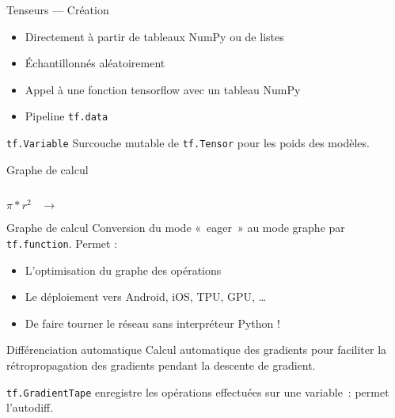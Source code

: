 \begin{frame}{Tenseurs --- Création}
  \begin{itemize}[<+->]
    \item Directement à partir de tableaux NumPy ou de listes
    \item Échantillonnés aléatoirement
    \item Appel à une fonction tensorflow avec un tableau NumPy
    \item Pipeline \texttt{tf.data}
  \end{itemize}
\end{frame}

\begin{frame}{\texttt{tf.Variable}}
  Surcouche mutable de \texttt{tf.Tensor} pour les poids des modèles.
\end{frame}

\begin{frame}{Graphe de calcul}
  \begin{minipage}[l]{0.15\linewidth}
      $\;$
  \end{minipage}\hfill
  \begin{minipage}[l]{0.35\linewidth}
    \huge
    \begin{center}
      $\pi*r^2\;\;\;\rightarrow$
    \end{center}
  \end{minipage}\hfill
  \begin{minipage}[l]{0.49\linewidth}
  \end{minipage}\hfill
\end{frame}

\begin{frame}{Graphe de calcul}
  Conversion du mode «~eager~» au mode graphe par \texttt{tf.function}. Permet :

  \begin{itemize}[<+->]
    \item L'optimisation du graphe des opérations
    \item Le déploiement vers Android, iOS, TPU, GPU, …
    \item De faire tourner le réseau sans interpréteur Python !
  \end{itemize}
\end{frame}

\begin{frame}{Différenciation automatique}
  Calcul automatique des gradients pour faciliter la rétropropagation des gradients pendant la descente de gradient.

  \texttt{tf.GradientTape} enregistre les opérations effectuées sur une variable~: permet l'autodiff.
\end{frame}

